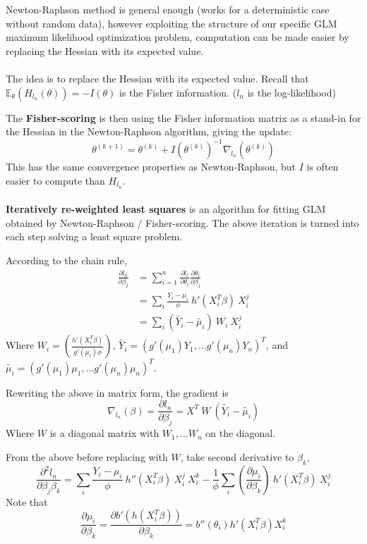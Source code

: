 \documentclass{article}
\begin{document}
Newton-Raphson method is general enough (works for a deterministic case without random data),
however exploiting the structure of our specific GLM maximum likelihood optimization problem,
computation can be made easier by replacing the Hessian with its expected value.
\\
\\
The idea is to replace the Hessian with its expected value.
Recall that $\mathbb{E}_{\theta}(H_{l_n}(\theta)) = -I (\theta)$ is the Fisher information.
($l_n$ is the log-likelihood)

The \textbf{Fisher-scoring} is then using the Fisher information matrix as a stand-in for the Hessian in the Newton-Raphson algorithm,
giving the update:
$$
\theta^{(k + 1)} = \theta^{(k)} + I(\theta^{(k)})^{-1} \nabla_{l_n}(\theta^{(k)})
$$
This has the same convergence properties as Newton-Raphson,
but $I$ is often easier to compute than $H_{l_n}$.
\\
\\

\textbf{Iteratively re-weighted least squares} is an algorithm for fitting GLM obtained by Newton-Raphson / Fisher-scoring.
The above iteration is turned into each step solving a least square problem.

According to the chain rule,
\begin{align*}
  \frac{\partial l_n}{\partial \beta_j} &= \sum_{i = 1}^{n} \frac{\partial l_i}{\partial \theta_i} \frac{\partial \theta_i}{\partial \beta_j} \\
                                        &= \sum_{i} \frac{Y_i - \mu_i}{\phi} ~ h'(X_i^T \beta) ~ X_i^j \\
                                        &= \sum_{i} (\tilde{Y_i} - \tilde{\mu_i}) ~ W_i ~ X_i^j
\end{align*}
Where $W_i = (\frac{h'(X_i^T \beta)}{g'(\mu_i) \phi})$,
$\tilde{Y_i} = (g'(\mu_1) Y_1, \dots g'(\mu_n) Y_n)^T$,
and $\tilde{\mu_i} = (g'(\mu_1) \mu_1, \dots g'(\mu_n) \mu_n)^T$.

Rewriting the above in matrix form, the gradient is
$$
\nabla_{l_n} (\beta) = \frac{\partial l_n}{\partial \beta_j} = X^T ~ W ~ (\tilde{Y_i} - \tilde{\mu_i})
$$
Where $W$ is a diagonal matrix with $W_1, \dots W_n$ on the diagonal.

From the above before replacing with $W$, take second derivative to $\beta_k$,
$$
\frac{\partial^2 l_n}{\partial \beta_j \beta_k} =
\sum_{i} \frac{Y_i - \mu_i}{\phi} ~ h''(X_i^T \beta) ~ X_i^j ~ X_i^k - \frac{1}{\phi} \sum_{i} (\frac{\partial \mu_i}{\partial \beta_k}) ~ h'(X_i^T \beta) ~ X_i^j
$$
Note that
$$
\frac{\partial \mu_i}{\partial \beta_k} =
\frac{\partial b'(h(X_i^T \beta))}{\partial \beta_k} = b''(\theta_i) h'(X_i^T \beta) X_i^k
$$
\end{document}
